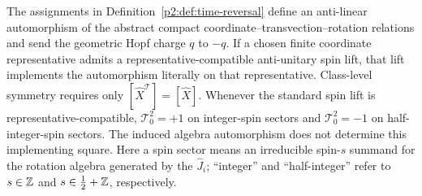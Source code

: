 \documentclass[12pt,a4paper]{article}
\begin{document}
\begin{theorem}
\label{p2:thm:time-reversal-action}
The assignments in Definition~\ref{p2:def:time-reversal} define an
anti-linear automorphism of the abstract compact
coordinate--transvection--rotation relations and send the geometric Hopf
charge \(q\) to \(-q\).  If a chosen finite coordinate representative admits a
representative-compatible anti-unitary spin lift, that lift implements the
automorphism literally on that representative.  Class-level symmetry requires
only \([\widehat X^{\mathcal T}]=[\widehat X]\).  Whenever the standard
spin lift is representative-compatible,
\(\mathcal T_0^2=+1\) on integer-spin sectors and
\(\mathcal T_0^2=-1\) on half-integer-spin sectors.  The induced algebra
automorphism does not determine this implementing square.  Here a spin sector
means an irreducible spin-\(s\) summand for the rotation algebra generated by
the \(\hat J_i\); ``integer'' and ``half-integer'' refer to
\(s\in\mathbb{Z}\) and \(s\in\tfrac12+\mathbb{Z}\), respectively.
\end{theorem}
\end{document}
